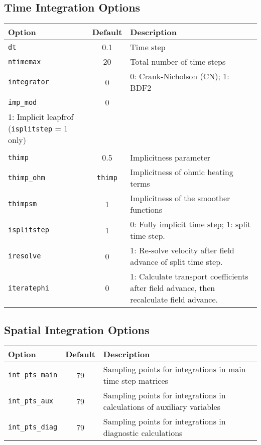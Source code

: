 \documentclass[letterpaper]{book}
\begin{document}
\subsection{Time Integration Options}
\begin{tabular}{lcp{3in}}
  \textbf{Option}&\textbf{Default}&\textbf{Description}\\
  \hline
  \texttt{dt}         & 0.1 & Time step\\
  \texttt{ntimemax}   & 20  & Total number of time steps\\
  \texttt{integrator} & 0   & 0: Crank-Nicholson (CN); 1: BDF2\\
  \texttt{imp\_mod}   & 0   & 
  \begin{minipage}[t]{3in}
    0: $\theta$-implicit\\
    1: Implicit leapfrof (\texttt{isplitstep} = 1 only)\\
  \end{minipage}\\
  \texttt{thimp}      & 0.5 & Implicitness parameter\\
  \texttt{thimp\_ohm} & \texttt{thimp} & 
                              Implicitness of ohmic heating terms\\
  \texttt{thimpsm}    & 1   & Implicitness of the smoother functions\\
  \texttt{isplitstep} & 1   & 0: Fully implicit time step; 
                              1: split time step.\\
  \texttt{iresolve}   & 0   & 1: Re-solve velocity after 
                              field advance of split time step.\\
  \texttt{iteratephi} & 0   & 1: Calculate transport coefficients after
    field advance, then recalculate field advance.
\end{tabular}


\subsection{Spatial Integration Options}
\begin{tabular}{lcp{3in}}
  \textbf{Option}&\textbf{Default}&\textbf{Description}\\
  \hline
  \texttt{int\_pts\_main}  & 79 & Sampling points for integrations in
                                main time step matrices\\
  \texttt{int\_pts\_aux}   & 79 & Sampling points for integrations in
                                calculations of auxiliary variables\\
  \texttt{int\_pts\_diag}  & 79 & Sampling points for integrations in
                                diagnostic calculations\\
\end{tabular}
\end{document}
